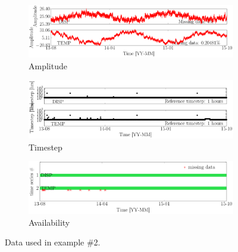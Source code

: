 \begin{figure}[h!]
\centering
\begin{subfigure}{\linewidth}
\includegraphics[width=0.9\linewidth]{./docfigs/Example_DISPTEMPSIM/raw/ALL_AMPLITUDES.pdf} 
\caption{Amplitude}
\end{subfigure}
\begin{subfigure}{\linewidth}
\includegraphics[width=0.9\linewidth]{./docfigs/Example_DISPTEMPSIM/raw/ALL_TIMESTEPS.pdf}
\caption{Timestep}
\end{subfigure}
\begin{subfigure}{\linewidth}
\includegraphics[width=0.9\linewidth]{./docfigs/Example_DISPTEMPSIM/raw/AVAILABILITY.pdf}
\caption{Availability}
\end{subfigure}
\caption{Data used in example \#2.}
\label{fig:DataSummaryRaw2}
\end{figure}



